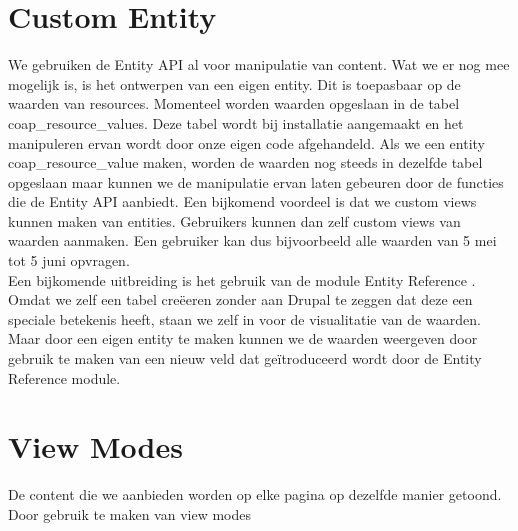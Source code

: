 \section{Custom Entity} \label{customEntity}
We gebruiken de Entity API al voor manipulatie van content. Wat we er nog mee mogelijk is, is het ontwerpen van een eigen entity. Dit is toepasbaar op de waarden van resources. Momenteel worden waarden opgeslaan in de tabel coap\_resource\_values. Deze tabel wordt bij installatie aangemaakt en het manipuleren ervan wordt door onze eigen code afgehandeld. Als we een entity coap\_resource\_value maken, worden de waarden nog steeds in dezelfde tabel opgeslaan maar kunnen we de manipulatie ervan laten gebeuren door de functies die de Entity API aanbiedt. Een bijkomend voordeel is dat we custom views kunnen maken van entities. Gebruikers kunnen dan zelf custom views van waarden aanmaken. Een gebruiker kan dus bijvoorbeeld alle waarden van 5 mei tot 5 juni opvragen.\\

Een bijkomende uitbreiding is het gebruik van de module Entity Reference \cite{entityReference}. Omdat we zelf een tabel cre\"{e}eren zonder aan Drupal te zeggen dat deze een speciale betekenis heeft, staan we zelf in voor de visualitatie van de waarden. Maar door een eigen entity te maken kunnen we de waarden weergeven door gebruik te maken van een nieuw veld dat ge\"{i}troduceerd wordt door de Entity Reference module.

\section{View Modes}
De content die we aanbieden worden op elke pagina op dezelfde manier getoond. Door gebruik te maken van view modes

